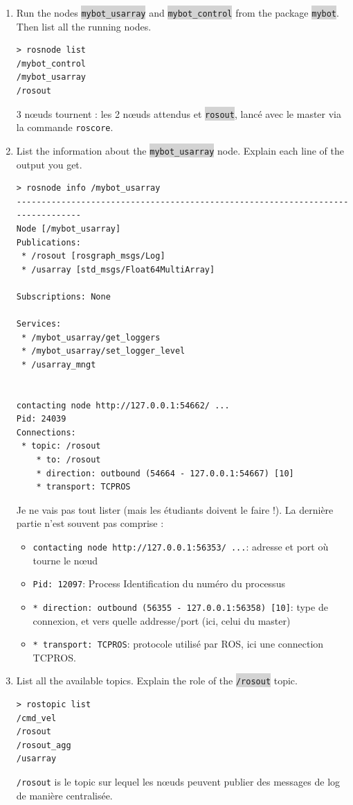 \documentclass[10pt,a4paper,english]{exam}
\newcounter{mainmemorder}
\newcommand{\load}{\setcounter{enumi}{\value{mainmemorder}}}
\newcommand{\mytext}[1]{\colorbox{lightgray}{\texttt{#1}}}
\begin{document}
\begin{enumerate}
	\load
	\item Run the nodes \mytext{mybot\_usarray} and \mytext{mybot\_control} from the package
	      \mytext{mybot}. Then list all the running nodes.

	      \begin{solution}
		      \begin{verbatim}
> rosnode list
/mybot_control
/mybot_usarray
/rosout	      			
		\end{verbatim}
		      3 nœuds tournent : les 2 nœuds attendus et \mytext{rosout}, lancé avec le master via la
		      commande \texttt{roscore}.
	      \end{solution}
	\item List the information about the \mytext{mybot\_usarray} node. Explain each line of the output
	      you get.

	      \begin{solution}
		      \begin{verbatim}
> rosnode info /mybot_usarray
--------------------------------------------------------------------------------
Node [/mybot_usarray]
Publications:
 * /rosout [rosgraph_msgs/Log]
 * /usarray [std_msgs/Float64MultiArray]

Subscriptions: None

Services:
 * /mybot_usarray/get_loggers
 * /mybot_usarray/set_logger_level
 * /usarray_mngt


contacting node http://127.0.0.1:54662/ ...
Pid: 24039
Connections:
 * topic: /rosout
    * to: /rosout
    * direction: outbound (54664 - 127.0.0.1:54667) [10]
    * transport: TCPROS			\end{verbatim}
		      Je ne vais pas tout lister (mais les étudiants doivent le faire !). La dernière partie
		      n'est souvent pas comprise :
		      \begin{itemize}
			      \item \verb+contacting node http://127.0.0.1:56353/ ...+: adresse et port où
			            tourne le nœud
			      \item \verb+Pid: 12097+: Process Identification du numéro du processus
			      \item  \verb+* direction: outbound (56355 - 127.0.0.1:56358) [10]+: type de
			            connexion, et vers quelle addresse/port (ici, celui du master)
			      \item \verb+* transport: TCPROS+: protocole utilisé par ROS, ici une connection
			            TCPROS.
		      \end{itemize}
	      \end{solution}
	\item List all the available topics. Explain the role of the \mytext{/rosout} topic.
	      \begin{solution}
		      \begin{verbatim}
> rostopic list
/cmd_vel
/rosout
/rosout_agg
/usarray	
			   \end{verbatim}
		      \texttt{/rosout} is le topic sur lequel les nœuds peuvent publier des messages de log de manière
		      centralisée.
	      \end{solution}


\end{enumerate}
\end{document}
